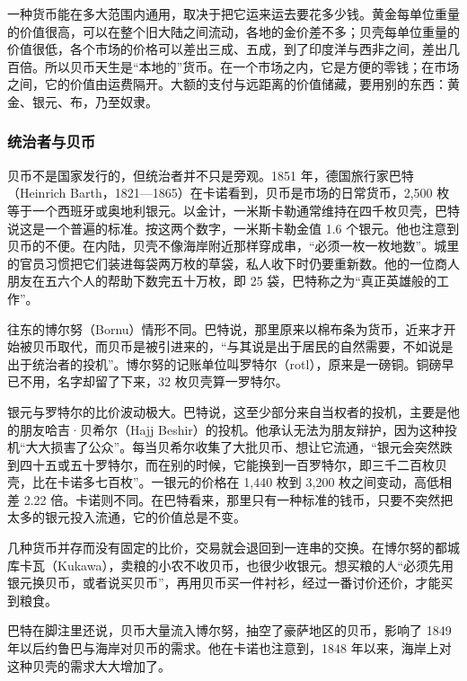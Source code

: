 \begin{intuition}[运不动的钱留在原地]
一种货币能在多大范围内通用，取决于把它运来运去要花多少钱。黄金每单位重量的价值很高，可以在整个旧大陆之间流动，各地的金价差不多；贝壳每单位重量的价值很低，各个市场的价格可以差出三成、五成，到了印度洋与西非之间，差出几百倍。所以贝币天生是“本地的”货币。在一个市场之内，它是方便的零钱；在市场之间，它的价值由运费隔开。大额的支付与远距离的价值储藏，要用别的东西：黄金、银元、布，乃至奴隶。
\end{intuition}

\subsubsection{统治者与贝币}
贝币不是国家发行的，但统治者并不只是旁观。1851 年，德国旅行家巴特（Heinrich Barth，1821—1865）在卡诺看到，贝币是市场的日常货币，2,500 枚等于一个西班牙或奥地利银元。以金计，一米斯卡勒通常维持在四千枚贝壳，巴特说这是一个普遍的标准\cite{barth1857}。按这两个数字，一米斯卡勒金值 1.6 个银元。他也注意到贝币的不便。在内陆，贝壳不像海岸附近那样穿成串，“必须一枚一枚地数”。城里的官员习惯把它们装进每袋两万枚的草袋，私人收下时仍要重新数。他的一位商人朋友在五六个人的帮助下数完五十万枚，即 25 袋，巴特称之为“真正英雄般的工作”\cite{barth1857}。

往东的博尔努（Bornu）情形不同。巴特说，那里原来以棉布条为货币，近来才开始被贝币取代，而贝币是被引进来的，“与其说是出于居民的自然需要，不如说是出于统治者的投机”\cite{barth1857}。博尔努的记账单位叫罗特尔（rotl），原来是一磅铜。铜磅早已不用，名字却留了下来，32 枚贝壳算一罗特尔。

银元与罗特尔的比价波动极大。巴特说，这至少部分来自当权者的投机，主要是他的朋友哈吉·贝希尔（Hajj Beshir）的投机。他承认无法为朋友辩护，因为这种投机“大大损害了公众”。每当贝希尔收集了大批贝币、想让它流通，“银元会突然跌到四十五或五十罗特尔，而在别的时候，它能换到一百罗特尔，即三千二百枚贝壳，比在卡诺多七百枚”\cite{barth1857}。一银元的价格在 1,440 枚到 3,200 枚之间变动，高低相差 2.22 倍。卡诺则不同。在巴特看来，那里只有一种标准的钱币，只要不突然把太多的银元投入流通，它的价值总是不变\cite{barth1857}。

几种货币并存而没有固定的比价，交易就会退回到一连串的交换。在博尔努的都城库卡瓦（Kukawa），卖粮的小农不收贝币，也很少收银元。想买粮的人“必须先用银元换贝币，或者说买贝币”，再用贝币买一件衬衫，经过一番讨价还价，才能买到粮食\cite{barth1857}。

巴特在脚注里还说，贝币大量流入博尔努，抽空了豪萨地区的贝币，影响了 1849 年以后约鲁巴与海岸对贝币的需求\cite{barth1857}。他在卡诺也注意到，1848 年以来，海岸上对这种贝壳的需求大大增加了。

